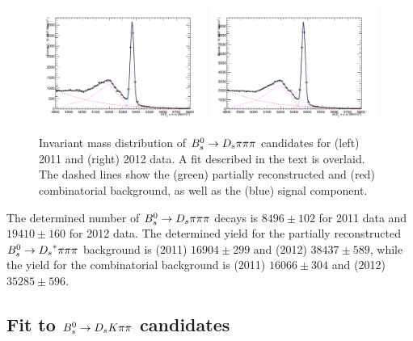 \begin{figure}[h]
\includegraphics[height=7.cm,width=0.49\textwidth]{figs/3pi_BmassFit_sim11.pdf}
\includegraphics[height=7.cm,width=0.49\textwidth]{figs/3pi_BmassFit_sim12.pdf}
\caption{Invariant mass distribution of ${{B}^0_{s}}\rightarrow{\ensuremath{{D}_{s}}}{\ensuremath{\pi}}{\ensuremath{\pi}}{\ensuremath{\pi}}$ candidates for (left) 2011 and (right) 2012 data.
A fit described in the text is overlaid. The dashed lines show the (green) partially reconstructed and (red) combinatorial background, as well as the (blue) signal component.}
\label{fig: BsDs3piFit}
\end{figure}

The determined number of ${{B}^0_{s}}\rightarrow{\ensuremath{{D}_{s}}}{\ensuremath{\pi}}{\ensuremath{\pi}}{\ensuremath{\pi}}$ decays is $8496 \pm 102$ for 2011 data and $19410 \pm 160$ for 2012 data. 
The determined yield for the partially reconstructed ${{B}^0_{s}}\rightarrow{\ensuremath{{D}_{s}}}^{*}{\pi}{\pi}{\pi}$ background is  (2011) $16904 \pm 299$ and (2012)  $38437 \pm 589$, 
while the yield for the combinatorial background is (2011) $16066 \pm 304$ and (2012) $35285 \pm 596$.



\subsection{Fit to ${{B}^0_{s}}\rightarrow{\ensuremath{{D}_{s}}}{\ensuremath{K}}{\ensuremath{\pi}}{\ensuremath{\pi}}$ candidates}
\label{subsec: SigFit}


